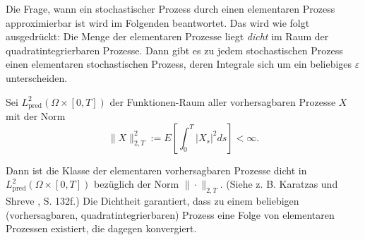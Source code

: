 \begin{satz}
Die Frage, wann ein stochastischer Prozess durch einen elementaren Prozess approximierbar ist wird im Folgenden 
beantwortet. Das wird wie folgt ausgedrückt: Die Menge der elementaren Prozesse liegt \textit{dicht} im Raum
der quadratintegrierbaren Prozesse. Dann gibt es zu jedem stochastischen Prozess einen elementaren stochastischen
Prozess, deren Integrale sich um ein beliebiges $\varepsilon$ unterscheiden.

Sei $L^2_{\mathrm{pred}}(\Omega\times[0,T])$ der Funktionen-Raum aller vorhersagbaren Prozesse $X$ mit der Norm
\begin{equation}\label{eq:ito_norm}
\|X\|_{2,T}^2 := E \left [ \int_0^T |X_s|^2 ds \right ] < \infty.  
\end{equation}

Dann ist die Klasse der elementaren vorhersagbaren Prozesse dicht 
in $L^2_{\mathrm{pred}}(\Omega\times[0,T])$ bezüglich der Norm $\|\cdot\|_{2,T}$. (Siehe z. B. Karatzas und Shreve \cite{karatzas_brownian_1991}, S. 132f.) 
Die Dichtheit garantiert, dass zu einem beliebigen (vorhersagbaren, quadratintegrierbaren) Prozess 
eine Folge von elementaren Prozessen existiert, die dagegen konvergiert.
\end{satz}

